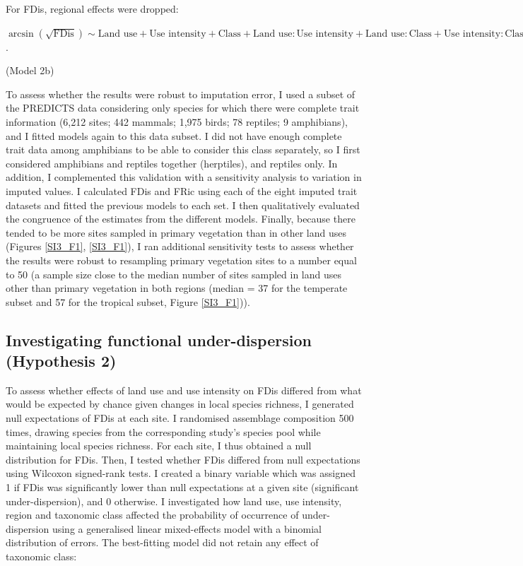 For FDis, regional effects were dropped:
\begin{center}
$\arcsin(\sqrt{\text{FDis}})\sim \text{Land use} + \text{Use intensity} + \text{Class} + \text{Land use}:\text{Use intensity} + \text{Land use}:\text{Class} + \text{Use intensity}:\text{Class}$.\\
\end{center}
\hspace*{\fill}(Model 2b)

To assess whether the results were robust to imputation error, I used a subset of the PREDICTS data considering only species for which there were complete trait information (6,212 sites; 442 mammals; 1,975 birds; 78 reptiles; 9 amphibians), and I fitted models again to this data subset. I did not have enough complete trait data among amphibians to be able to consider this class separately, so I first considered amphibians and reptiles together (herptiles), and reptiles only. In addition, I complemented this validation with a sensitivity analysis to variation in imputed values. I calculated FDis and FRic using each of the eight imputed trait datasets and fitted the previous models to each set. I then qualitatively evaluated the congruence of the estimates from the different models. Finally, because there tended to be more sites sampled in primary vegetation than in other land uses (Figures \ref{SI3_F1}, \ref{SI3_F1}), I ran additional sensitivity tests to assess whether the results were robust to resampling primary vegetation sites to a number equal to 50 (a sample size close to the median number of sites sampled in land uses other than primary vegetation in both regions (median = 37 for the temperate subset and 57 for the tropical subset, Figure \ref{SI3_F1})).


\subsection{Investigating functional under-dispersion (Hypothesis 2)}

To assess whether effects of land use and use intensity on FDis differed from what would be expected by chance given changes in local species richness, I generated null expectations of FDis at each site. I randomised assemblage composition 500 times, drawing species from the corresponding study's species pool while maintaining local species richness. For each site, I thus obtained a null distribution for FDis. Then, I tested whether FDis differed from null expectations using Wilcoxon signed-rank tests. I created a binary variable which was assigned 1 if FDis was significantly lower than null expectations at a given site (significant under-dispersion), and 0 otherwise. I investigated how land use, use intensity, region and taxonomic class affected the probability of occurrence of under-dispersion using a generalised linear mixed-effects model with a binomial distribution of errors. The best-fitting model did not retain any effect of taxonomic class:

